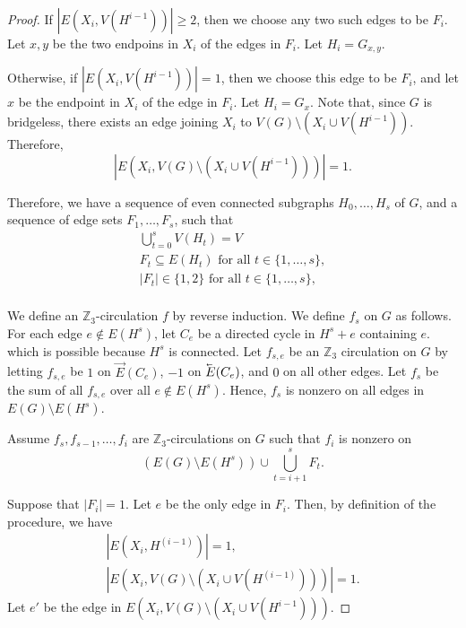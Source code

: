 \begin{proof}
	If \(|E(X_i, V(H^{i-1}))| \geq 2\), 
	then we choose any two such edges to be \(F_i\).
	Let \(x, y\) be the two endpoins in \(X_i\) of the edges in \(F_i\).
	Let \(H_i = G_{x, y}\).

	Otherwise, if \(|E(X_i, V(H^{i-1}))| = 1\),
	then we choose this edge to be \(F_i\),
	and let \(x\) be the endpoint in \(X_i\) of the edge in \(F_i\).
	Let \(H_i = G_{x}\).
	Note that, since \(G\) is bridgeless,
	there exists an edge joining \(X_i\) to \(V(G) \setminus (X_i \cup V(H^{i-1}))\).
	Therefore,
	\begin{equation}
		|E(X_i, V(G) \setminus (X_i \cup V(H^{i-1})))| = 1.
	\end{equation}

	Therefore,
	we have a sequence of even connected subgraphs \(H_0, \dots, H_s\) of \(G\),
	and a sequence of edge sets \(F_1, \dots, F_s\),
	such that
	\begin{gather}
		\bigcup_{t = 0}^{s} V(H_t) = V \\
		F_t \subseteq E(H_t) \text{ for all } t \in \{1, \dots, s\}, \\
		|F_t| \in \{1, 2\} \text{ for all } t \in \{1, \dots, s\}, \\
	\end{gather}

	We define an \(\mathbb{Z}_3\)-circulation \(f\) by reverse induction.
	We define \(f_s\) on \(G\) as follows.
	For each edge \(e \notin E(H^{s})\),
	let \(C_e\) be a directed cycle in \(H^{s} + e\) containing \(e\).
	which is possible because \(H^{s}\) is connected.
	Let \(f_{s, e}\) be an \(\mathbb{Z}_3\) circulation on \(G\) by letting \(f_{s, e}\) be \(1\) on \(\vec{E}(C_e)\), \(-1\) on \(\cev{E}(C_e)\), and \(0\) on all other edges.
	Let \(f_s\) be the sum of all \(f_{s, e}\) over all \(e \notin E(H^{s})\).
	Hence, \(f_s\) is nonzero on all edges in \(E(G) \setminus E(H^{s})\).

	Assume \(f_s, f_{s-1}, \dots, f_{i}\) are \(\mathbb{Z}_3\)-circulations on \(G\) such that \(f_i\) is nonzero on
	\begin{equation}
		(E(G) \setminus E(H^{s})) \cup \bigcup_{t = i+1}^{s} F_t.
	\end{equation}

	Suppose that \(|F_i| = 1\).
	Let \(e\) be the only edge in \(F_i\).
	Then, by definition of the procedure, we have
	\begin{gather}
		|E(X_i, H^{(i-1)})| = 1, \\
		|E(X_i, V(G) \setminus (X_i \cup V(H^{(i-1)})))| = 1.
	\end{gather}
	Let \(e'\) be the edge in \(E(X_i, V(G) \setminus (X_i \cup V(H^{i-1})))\).


\end{proof}
